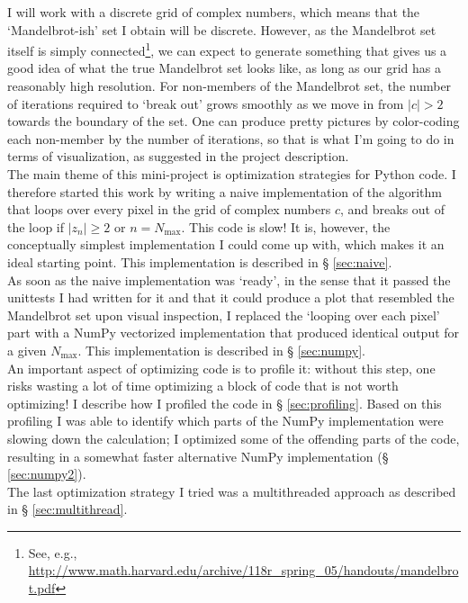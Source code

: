 \documentclass[paper=a4, fontsize=11pt]{scrartcl} %
\numberwithin{equation}{section} %
\numberwithin{figure}{section} %
\numberwithin{table}{section} %
\begin{document}
I will work with a discrete grid of complex numbers, which means that the `Mandelbrot-ish' set I obtain will be discrete. However, as the Mandelbrot set itself is simply connected\footnote{See, e.g., \url{http://www.math.harvard.edu/archive/118r_spring_05/handouts/mandelbrot.pdf}}, we can expect to generate something that gives us a good idea of what the true Mandelbrot set looks like, as long as our grid has a reasonably high resolution. For non-members of the Mandelbrot set, the number of iterations required to `break out' grows smoothly as we move in from $|c|>2$ towards the boundary of the set. One can produce pretty pictures by color-coding each non-member by the number of iterations, so that is what I'm going to do in terms of visualization, as suggested in the project description.\\

The main theme of this mini-project is optimization strategies for Python code. I therefore started this work by writing a naive implementation of the algorithm that loops over every pixel in the grid of complex numbers $c$, and breaks out of the loop if $|z_n|\ge2$ or $n=N_\mathrm{max}$. This code is slow! It is, however, the conceptually simplest implementation I could come up with, which makes it an ideal starting point. This implementation is described in § \ref{sec:naive}.\\

As soon as the naive implementation was `ready', in the sense that it passed the unittests I had written for it and that it could produce a plot that resembled the Mandelbrot set upon visual inspection, I replaced the `looping over each pixel' part with a NumPy vectorized implementation that produced identical output for a given $N_\mathrm{max}$. This implementation is described in § \ref{sec:numpy}.\\ 

An important aspect of optimizing code is to profile it: without this step, one risks wasting a lot of time optimizing a block of code that is not worth optimizing! I describe how I profiled the code in § \ref{sec:profiling}. Based on this profiling I was able to identify which parts of the NumPy implementation were slowing down the calculation; I optimized some of the offending parts of the code, resulting in a somewhat faster alternative NumPy implementation (§ \ref{sec:numpy2}).\\

The last optimization strategy I tried was a multithreaded approach as described in § \ref{sec:multithread}.\\ 
\end{document}
